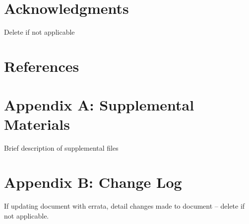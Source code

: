 \documentclass[12pt]{article}
\begin{document}
\section*{Acknowledgments}
\noindent Delete if not applicable\\

\section*{References}




\section*{Appendix A: Supplemental Materials}
Brief description of supplemental files\\

\section*{Appendix B: Change Log}
If updating document with errata, detail changes made to document – delete if not applicable. \\%
\end{document}

